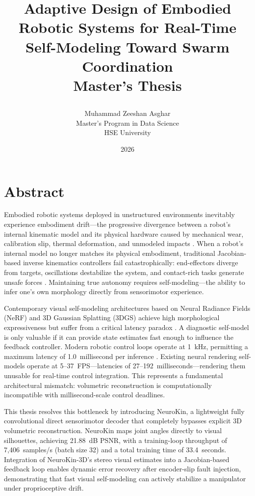 \documentclass[12pt,a4paper,oneside]{report}
\title{
    \vspace{2cm}
    \textbf{\Large Adaptive Design of Embodied Robotic Systems for Real-Time Self-Modeling Toward Swarm Coordination} \\
    \vspace{1cm}
    \large Master's Thesis

}
\author{
    Muhammad Zeeshan Asghar \\
    Master's Program in Data Science \\
    HSE University
}
\date{\vspace{1cm} 2026}
\begin{document}

\clearpage

\chapter*{Abstract}

Embodied robotic systems deployed in unstructured environments inevitably experience embodiment drift---the progressive divergence between a robot's internal kinematic model and its physical hardware caused by mechanical wear, calibration slip, thermal deformation, and unmodeled impacts \cite{bongard2006resilient, cully2015robots}. When a robot's internal model no longer matches its physical embodiment, traditional Jacobian-based inverse kinematics controllers fail catastrophically: end-effectors diverge from targets, oscillations destabilize the system, and contact-rich tasks generate unsafe forces \cite{kwiatkowski2019task, chen2022full}. Maintaining true autonomy requires self-modeling---the ability to infer one's own morphology directly from sensorimotor experience.

Contemporary visual self-modeling architectures based on Neural Radiance Fields (NeRF) and 3D Gaussian Splatting (3DGS) achieve high morphological expressiveness but suffer from a critical latency paradox \cite{hu2024teaching, hu2025learning}. A diagnostic self-model is only valuable if it can provide state estimates fast enough to influence the feedback controller. Modern robotic control loops operate at 1~kHz, permitting a maximum latency of 1.0~millisecond per inference \cite{siciliano2009robotics}. Existing neural rendering self-models operate at 5--37~FPS---latencies of 27--192~milliseconds---rendering them unusable for real-time control integration. This represents a fundamental architectural mismatch: volumetric reconstruction is computationally incompatible with millisecond-scale control deadlines.

This thesis resolves this bottleneck by introducing NeuroKin, a lightweight fully convolutional direct sensorimotor decoder that completely bypasses explicit 3D volumetric reconstruction. NeuroKin maps joint angles directly to visual silhouettes, achieving 21.88~dB PSNR, with a training-loop throughput of 7,406~samples/s (batch size 32) and a total training time of 33.4~seconds. Integration of NeuroKin-3D's stereo visual estimates into a Jacobian-based feedback loop enables dynamic error recovery after encoder-slip fault injection, demonstrating that fast visual self-modeling can actively stabilize a manipulator under proprioceptive drift.
\end{document}
